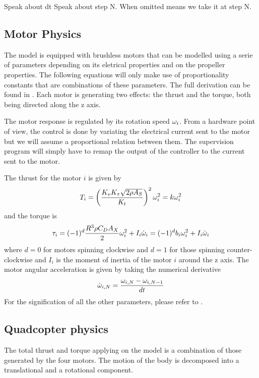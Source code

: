 Speak about dt
Speak about step N. When omitted means we take it at step N.

\subsection{Motor Physics}
The model is equipped with brushless motors that can be modelled using a serie
of parameters depending on its eletrical properties and on the propeller
properties. The following equations will only make use of proportionality
constants that are combinations of these parameters. The full derivation can be
found in .
Each motor is generating two effects: the thrust and the torque, both being directed along the z axis.
	
The motor response is regulated by its rotation speed $\omega_i$. From a hardware
point of view, the control is done by variating the electrical current sent to
the motor but we will assume a proportional relation between them. The
supervision program will simply have to remap the output of the controller to
the current sent to the motor.

The thrust for the motor $i$ is given by
\begin{equation}
	T_i = \left(\frac{K_vK_\tau\sqrt{2\rho A_S}}{K_t}\right)^2\omega_i^2
	= k\omega_i^2
\end{equation}
and the torque is
\begin{equation}
	\tau_i = (-1)^{d}\frac{R^3\rho C_D A_X}{2}\omega_i^2 + I_i\dot{\omega}_i = (-1)^{d}b_i\omega_i^2
	+ I_i\dot{\omega}_i
\end{equation}
where $d=0$ for motors spinning clockwise and $d=1$ for those spinning
counter-clockwise and $I_i$ is the moment of inertia of the motor $i$ around the z
axis. The motor angular acceleration is given by taking the numerical derivative
\begin{equation}
	\dot{\omega}_{i,N} = \frac{\omega_{i,N}-\omega_{i,N-1}}{dt}
\end{equation} 
For the signification of all the other parameters, please refer to .

\subsection{Quadcopter physics}
The total thrust and torque applying on the model is a combination of those
generated by the four motors. The motion of the body is decomposed into a
translational and a rotational component.

